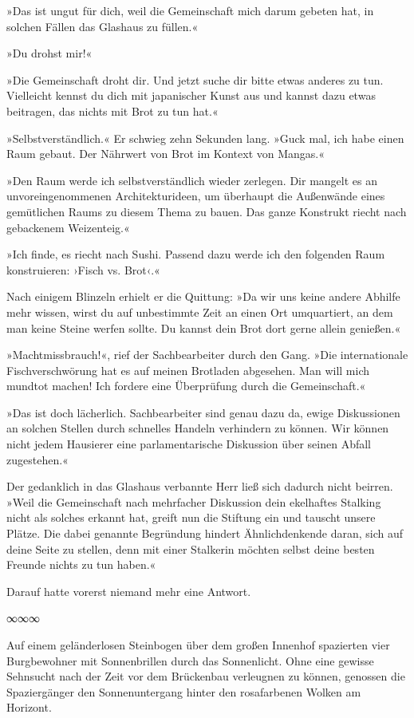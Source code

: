 »Das ist ungut für dich, weil die Gemeinschaft mich darum gebeten hat, in solchen Fällen das Glashaus zu füllen.«

»Du drohst mir!«

»Die Gemeinschaft droht dir. Und jetzt suche dir bitte etwas anderes zu tun. Vielleicht kennst du dich mit japanischer Kunst aus und kannst dazu etwas beitragen, das nichts mit Brot zu tun hat.«

»Selbstverständlich.« Er schwieg zehn Sekunden lang. »Guck mal, ich habe einen Raum gebaut. Der Nährwert von Brot im Kontext von Mangas.«

»Den Raum werde ich selbstverständlich wieder zerlegen. Dir mangelt es an unvoreingenommenen Architekturideen, um überhaupt die Außenwände eines gemütlichen Raums zu diesem Thema zu bauen. Das ganze Konstrukt riecht nach gebackenem Weizenteig.«

»Ich finde, es riecht nach Sushi. Passend dazu werde ich den folgenden Raum konstruieren: ›Fisch vs. Brot‹.«

Nach einigem Blinzeln erhielt er die Quittung: »Da wir uns keine andere Abhilfe mehr wissen, wirst du auf unbestimmte Zeit an einen Ort umquartiert, an dem man keine Steine werfen sollte. Du kannst dein Brot dort gerne allein genießen.«

»Machtmissbrauch!«, rief der Sachbearbeiter durch den Gang. »Die internationale Fischverschwörung hat es auf meinen Brotladen abgesehen. Man will mich mundtot machen! Ich fordere eine Überprüfung durch die Gemeinschaft.«

»Das ist doch lächerlich. Sachbearbeiter sind genau dazu da, ewige Diskussionen an solchen Stellen durch schnelles Handeln verhindern zu können. Wir können nicht jedem Hausierer eine parlamentarische Diskussion über seinen Abfall zugestehen.«

Der gedanklich in das Glashaus verbannte Herr ließ sich dadurch nicht beirren. »Weil die Gemeinschaft nach mehrfacher Diskussion dein ekelhaftes Stalking nicht als solches erkannt hat, greift nun die Stiftung ein und tauscht unsere Plätze. Die dabei genannte Begründung hindert Ähnlichdenkende daran, sich auf deine Seite zu stellen, denn mit einer Stalkerin möchten selbst deine besten Freunde nichts zu tun haben.«

Darauf hatte vorerst niemand mehr eine Antwort.

\begin{center}
	∞∞∞
\end{center}

Auf einem geländerlosen Steinbogen über dem großen Innenhof spazierten vier Burgbewohner mit Sonnenbrillen durch das Sonnenlicht. Ohne eine gewisse Sehnsucht nach der Zeit vor dem Brückenbau verleugnen zu können, genossen die Spaziergänger den Sonnenuntergang hinter den rosafarbenen Wolken am Horizont.

